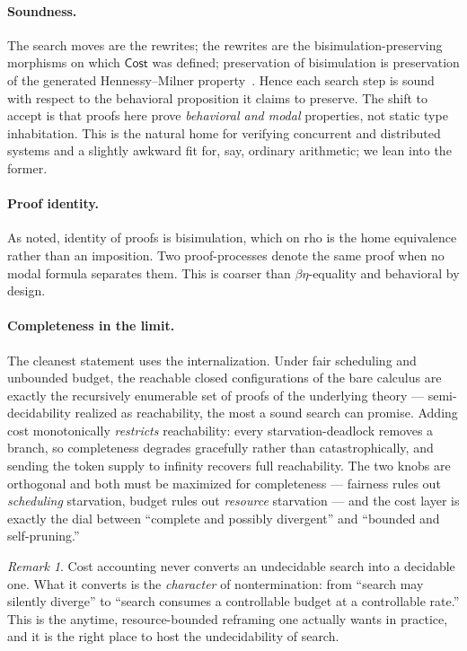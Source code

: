 \documentclass[11pt]{article}
\theoremstyle{plain}
\theoremstyle{definition}
\theoremstyle{remark}
\newtheorem{remark}[theorem]{Remark}
\newcommand{\Cost}{\mathsf{Cost}}
\begin{document}
\paragraph{Soundness.} The search moves are the rewrites; the rewrites are the
bisimulation-preserving morphisms on which $\Cost$ was defined; preservation of
bisimulation is preservation of the generated Hennessy--Milner
property~\cite{hennessymilner}. Hence each search step is sound with respect to
the behavioral proposition it claims to preserve. The shift to accept is that
proofs here prove \emph{behavioral and modal} properties, not static type
inhabitation. This is the natural home for verifying concurrent and distributed
systems and a slightly awkward fit for, say, ordinary arithmetic; we lean into
the former.

\paragraph{Proof identity.} As noted, identity of proofs is bisimulation, which
on rho is the home equivalence rather than an imposition. Two proof-processes
denote the same proof when no modal formula separates them. This is coarser than
$\beta\eta$-equality and behavioral by design.

\paragraph{Completeness in the limit.} The cleanest statement uses the
internalization. Under fair scheduling and unbounded budget, the reachable
closed configurations of the bare calculus are exactly the recursively
enumerable set of proofs of the underlying theory --- semi-decidability realized
as reachability, the most a sound search can promise. Adding cost monotonically
\emph{restricts} reachability: every starvation-deadlock removes a branch, so
completeness degrades gracefully rather than catastrophically, and sending the
token supply to infinity recovers full reachability. The two knobs are
orthogonal and both must be maximized for completeness --- fairness rules out
\emph{scheduling} starvation, budget rules out \emph{resource} starvation --- and
the cost layer is exactly the dial between ``complete and possibly divergent''
and ``bounded and self-pruning.''

\begin{remark}
Cost accounting never converts an undecidable search into a decidable one. What
it converts is the \emph{character} of nontermination: from ``search may
silently diverge'' to ``search consumes a controllable budget at a controllable
rate.'' This is the anytime, resource-bounded reframing one actually wants in
practice, and it is the right place to host the undecidability of search.
\end{remark}
\end{document}
